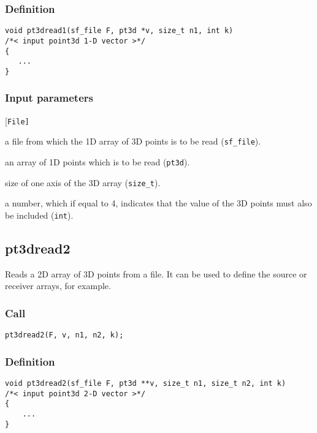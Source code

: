 \subsubsection*{Definition}
\begin{verbatim}
void pt3dread1(sf_file F, pt3d *v, size_t n1, int k)
/*< input point3d 1-D vector >*/
{
   ...
}
\end{verbatim}

\subsubsection*{Input parameters}
\begin{desclist}{\tt }{\quad}[\tt File]
   \setlength\itemsep{0pt}
   \item[File] a file from which the 1D array of 3D points is to be read (\texttt{sf\_file}). 
   \item[v]    an array of 1D points which is to be read (\texttt{pt3d}). 
   \item[n1]   size of one axis of the 3D array (\texttt{size\_t}). 
   \item[k]    a number, which if equal to 4, indicates that the value of the 3D points must also be included (\texttt{int}).     
\end{desclist}




\subsection{{pt3dread2}}
Reads a 2D array of 3D points from a file. It can be used to define the source or receiver arrays, for example.

\subsubsection*{Call}
\begin{verbatim}pt3dread2(F, v, n1, n2, k);\end{verbatim}

\subsubsection*{Definition}
\begin{verbatim}
void pt3dread2(sf_file F, pt3d **v, size_t n1, size_t n2, int k)
/*< input point3d 2-D vector >*/
{
    ...
}
\end{verbatim}

